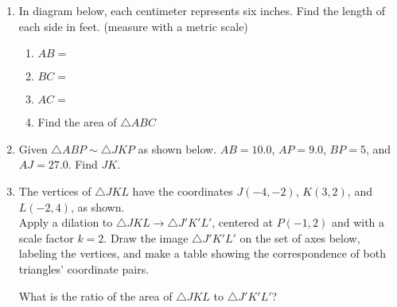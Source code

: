 \documentclass[12pt, twoside]{article}
\begin{document}
\begin{enumerate}
\item In diagram below, each centimeter represents six inches. Find the length of each side in feet. (measure with a metric scale)
  \begin{multicols}{2}
    \begin{enumerate}[itemsep=1.5cm]
      \item $AB=$
      \item $BC=$
      \item $AC=$ 
      \item Find the area of $\triangle ABC$
    \end{enumerate}
  \begin{center}
  \end{center}
  \end{multicols}%

\newpage
\item Given $\triangle ABP \sim \triangle JKP$ as shown below. $AB=10.0$, $AP=9.0$, $BP=5$, and $AJ=27.0$. Find $JK$.
    \begin{flushright}
      \end{flushright}
      \vspace{0.5cm}

\item The vertices of $\triangle JKL$ have the coordinates $J(-4,-2)$, $K(3,2)$, and $L(-2,4)$, as shown. \\[0.25cm]
    Apply a dilation to $\triangle JKL \rightarrow \triangle J'K'L'$, centered at $P(-1,2)$ and with a scale factor $k=2$. Draw the image $\triangle J'K'L'$ on the set of axes below, labeling the vertices, and make a table showing the correspondence of both triangles' coordinate pairs.
      \begin{flushright}
      \end{flushright}
      What is the ratio of the area of $\triangle JKL$ to $\triangle J'K'L'$?


\end{enumerate}
\end{document}
